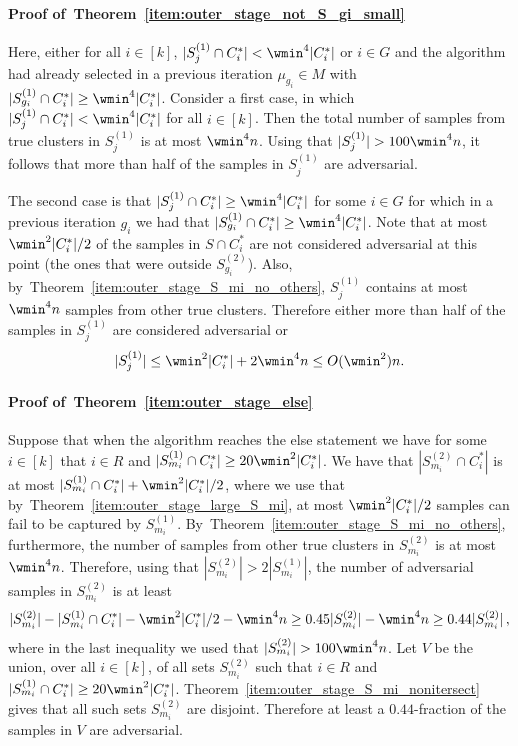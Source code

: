 \paragraph{Proof of~Theorem~\ref{item:outer_stage_not_S_gi_small}}
Here, either for all $i \in [k]$, $|S_j^{(1)} \cap C_i^*| < \wmin^4 |C_i^*|$ or \(i \in G\) and the algorithm had already selected in a previous iteration  $\mu_{g_i} \in M$ with $|S_{g_i}^{(1)} \cap C_i^*| \geq \wmin^4 |C_i^*|$.
Consider a first case, in which $|S_j^{(1)} \cap C_i^*| < \wmin^4 |C_i^*|$ for all $i \in [k]$.
Then the total number of samples from true clusters in $S_j^{(1)}$ is at most $\wmin^4 n$.
Using that $|S_j^{(1)}| > 100\wmin^4 n$, it follows that more than half of the samples in $S_j^{(1)}$ are adversarial. 

The second case is that $|S_j^{(1)} \cap C_i^*| \geq \wmin^4 |C_i^*|$ for some $i \in G$ for which in a previous iteration \(g_i\) we had that $|S_{g_i}^{(1)} \cap C_i^*| \geq \wmin^4 |C_i^*|$.
Note that at most $\wmin^2 |C_i^*|/2$ of the samples in $S \cap C_i^*$ are not considered adversarial at this point (the ones that were outside $S_{g_i}^{(2)}$).
Also, by~Theorem~\ref{item:outer_stage_S_mi_no_others}, $S_j^{(1)}$ contains at most $\wmin^4 n$ samples from other true clusters.
Therefore either more than half of the samples in $S_j^{(1)}$ are considered adversarial or \[|S_j^{(1)}| \leq \wmin^2 |C_i^*| + 2 \wmin^4 n \leq O(\wmin^2) n.\]

\paragraph{Proof of~Theorem~\ref{item:outer_stage_else}}
Suppose that when the algorithm reaches the else statement we have for some $i \in [k]$ that $i \in R$ and $|S_{m_i}^{(1)} \cap C_i^*| \geq 20 \wmin^2 |C_i^*|$. 
We have that $|S_{m_i}^{(2)} \cap C_i^*|$ is at most $|S_{m_i}^{(1)} \cap C_i^*| + \wmin^2 |C_i^*| / 2$, where we use that by~Theorem~\ref{item:outer_stage_large_S_mi}, at most $\wmin^2 |C_i^*|/2$ samples can fail to be captured by $S_{m_i}^{(1)}$. 
By~Theorem~\ref{item:outer_stage_S_mi_no_others}, furthermore, the number of samples from other true clusters in $S_{m_i}^{(2)}$ is at most $\wmin^4 n$.
Therefore, using that $|S_{m_i}^{(2)}| > 2 |S_{m_i}^{(1)}|$, the number of adversarial samples in $S_{m_i}^{(2)}$ is at least 
\[|S_{m_i}^{(2)}| - |S_{m_i}^{(1)} \cap C_i^*| - \wmin^2 |C_i^*| / 2 - \wmin^4 n \geq 0.45 |S_{m_i}^{(2)}| - \wmin^4 n \geq 0.44 |S_{m_i}^{(2)}|\,,\]
where in the last inequality we used that $|S_{m_i}^{(2)}| > 100 \wmin^4 n$.
Let $V$ be the union, over all $i \in [k]$, of all sets $S_{m_i}^{(2)}$ such that $i \in R$ and $|S_{m_i}^{(1)} \cap C_i^*| \geq 20 \wmin^2 |C_i^*|$.
Theorem~\ref{item:outer_stage_S_mi_nonitersect} gives that all such sets $S_{m_i}^{(2)}$ are disjoint. 
Therefore at least a $0.44$-fraction of the samples in $V$ are adversarial.

